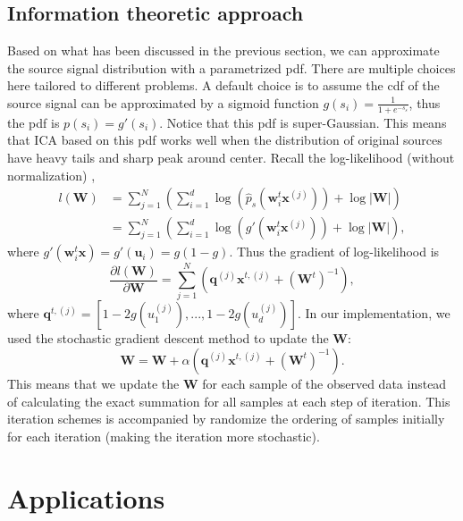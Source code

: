 \documentclass[aps,prl,preprint,superscriptaddress]{revtex4-2}
\begin{document}
\subsection{Information theoretic approach}
Based on what has been discussed in the previous section, we can approximate the source signal distribution with a parametrized pdf. There are multiple choices here tailored to different problems. A default choice is to assume the cdf of the source signal can be approximated by a sigmoid function $g(s_{i}) = \frac{1}{1+e^{-s_{s}}}$, thus the pdf is $p(s_{i}) = g'(s_{i})$. Notice that this pdf is super-Gaussian. This means that ICA based on this pdf works well when the distribution of original sources have heavy tails and sharp peak around center. Recall the log-likelihood (without normalization) \cite{ng_cs229}, 
\begin{align}
l(\mathbf{W}) &= \sum_{j=1}^{N}(\sum_{i=1}^{d}\log(\hat{p}_{s}(\mathbf{w}_{i}^{t}\mathbf{x}^{(j)}))+\log|\mathbf{W}|) \\
&= \sum_{j=1}^{N}(\sum_{i=1}^{d}\log(g'(\mathbf{w}_{i}^{t}\mathbf{x}^{(j)}))+\log|\mathbf{W}|),
\end{align} where $g'(\mathbf{w}_{i}^{t}\mathbf{x}) = g'(\mathbf{u}_{i}) = g(1-g)$. Thus the gradient of log-likelihood is 
\begin{equation}
\frac{\partial l(\mathbf{W})}{\partial \mathbf{W}} = \sum_{j=1}^{N}(\mathbf{q}^{(j)}\mathbf{x}^{t, (j)} + (\mathbf{W}^{t})^{-1}),
\end{equation} where $\mathbf{q}^{t, (j)} = [1-2g(u_{1}^{(j)}), ... ,1-2g(u_{d}^{(j)}) ]$. 
In our implementation, we used the stochastic gradient descent method to update the $\mathbf{W}$:
\begin{equation}
\mathbf{W} = \mathbf{W} + \alpha (\mathbf{q}^{(j)}\mathbf{x}^{t, (j)} + (\mathbf{W}^{t})^{-1}).
\end{equation} This means that we update the $\mathbf{W}$ for each sample of the observed data instead of calculating the exact summation for all samples at each step of iteration. This iteration schemes is accompanied by randomize the ordering of samples initially for each iteration (making the iteration more stochastic). 
\section{Applications}
\end{document}
